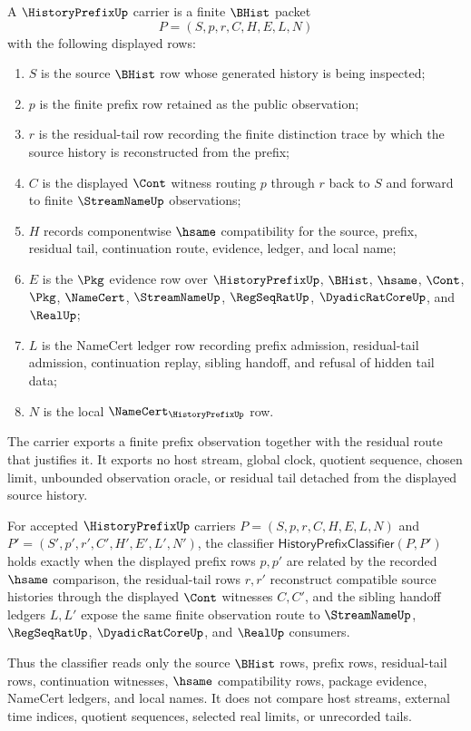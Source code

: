 \begin{definition}
\label{def:history-prefix-namecert-carrier}
A $\HistoryPrefixUp$ carrier is a finite $\BHist$ packet
$$
P=(S,p,r,C,H,E,L,N)
$$
with the following displayed rows:
\begin{enumerate}
\item $S$ is the source $\BHist$ row whose generated history is being inspected;
\item $p$ is the finite prefix row retained as the public observation;
\item $r$ is the residual-tail row recording the finite distinction trace by which the source history is reconstructed from the prefix;
\item $C$ is the displayed $\Cont$ witness routing $p$ through $r$ back to $S$ and forward to finite $\StreamNameUp$ observations;
\item $H$ records componentwise $\hsame$ compatibility for the source, prefix, residual tail, continuation route, evidence, ledger, and local name;
\item $E$ is the $\Pkg$ evidence row over $\HistoryPrefixUp$, $\BHist$, $\hsame$, $\Cont$, $\Pkg$, $\NameCert$, $\StreamNameUp$, $\RegSeqRatUp$, $\DyadicRatCoreUp$, and $\RealUp$;
\item $L$ is the NameCert ledger row recording prefix admission, residual-tail admission, continuation replay, sibling handoff, and refusal of hidden tail data;
\item $N$ is the local $\NameCert_{\HistoryPrefixUp}$ row.
\end{enumerate}
The carrier exports a finite prefix observation together with the residual route that justifies it. It exports no host stream, global clock, quotient sequence, chosen limit, unbounded observation oracle, or residual tail detached from the displayed source history.
\end{definition}

\begin{definition}
\label{def:history-prefix-namecert-classifier}
For accepted $\HistoryPrefixUp$ carriers $P=(S,p,r,C,H,E,L,N)$ and $P'=(S',p',r',C',H',E',L',N')$, the classifier $\mathsf{HistoryPrefixClassifier}(P,P')$ holds exactly when the displayed prefix rows $p,p'$ are related by the recorded $\hsame$ comparison, the residual-tail rows $r,r'$ reconstruct compatible source histories through the displayed $\Cont$ witnesses $C,C'$, and the sibling handoff ledgers $L,L'$ expose the same finite observation route to $\StreamNameUp$, $\RegSeqRatUp$, $\DyadicRatCoreUp$, and $\RealUp$ consumers.

Thus the classifier reads only the source $\BHist$ rows, prefix rows, residual-tail rows, continuation witnesses, $\hsame$ compatibility rows, package evidence, NameCert ledgers, and local names. It does not compare host streams, external time indices, quotient sequences, selected real limits, or unrecorded tails.
\end{definition}

